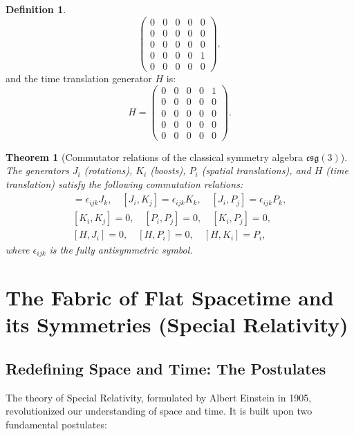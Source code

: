 \documentclass{amsart}
\newtheorem{theorem}{Theorem}[section]
\theoremstyle{definition}
\newtheorem{definition}{Definition}[theorem]
\theoremstyle{remark}
\begin{document}
\begin{definition}
\begin{equation*}
\begin{pmatrix}
      0 & 0 & 0 & 0 & 0 \\
      0 & 0 & 0 & 0 & 0 \\
      0 & 0 & 0 & 0 & 0 \\
      0 & 0 & 0 & 0 & 1 \\
      0 & 0 & 0 & 0 & 0
    \end{pmatrix},
  \end{equation*}
  and the time translation generator $H$ is:
  \begin{equation*}
    H =
    \begin{pmatrix}
      0 & 0 & 0 & 0 & 1 \\
      0 & 0 & 0 & 0 & 0 \\
      0 & 0 & 0 & 0 & 0 \\
      0 & 0 & 0 & 0 & 0 \\
      0 & 0 & 0 & 0 & 0
    \end{pmatrix}.
  \end{equation*}
\end{definition}

\begin{theorem}[Commutator relations of the classical symmetry algebra $\mathfrak{csg}(3)$]\label{thm:csg3_commutation_relations}
  The generators \(J_i\) (rotations), \(K_i\) (boosts), \(P_i\) (spatial translations), and \(H\) (time translation) satisfy the following commutation relations:
  \begin{gather*}
    [J_i, J_j] = \epsilon_{ijk} J_k, \quad
    [J_i, K_j] = \epsilon_{ijk} K_k, \quad
    [J_i, P_j] = \epsilon_{ijk} P_k, \\
    [K_i, K_j] = 0, \quad
    [P_i, P_j] = 0, \quad
    [K_i, P_j] = 0, \\
    [H, J_i] = 0, \quad
    [H, P_i] = 0, \quad
    [H, K_i] = P_i,
  \end{gather*}
  where $\epsilon_{ijk}$ is the fully antisymmetric symbol.
\end{theorem}

\section{The Fabric of Flat Spacetime and its Symmetries (Special Relativity)}
\label{sec:sr}

\subsection{Redefining Space and Time: The Postulates}
\label{subsec:sr_postulates}
The theory of Special Relativity, formulated by Albert Einstein in 1905, revolutionized our understanding of space and time. It is built upon two fundamental postulates:
\end{document}
